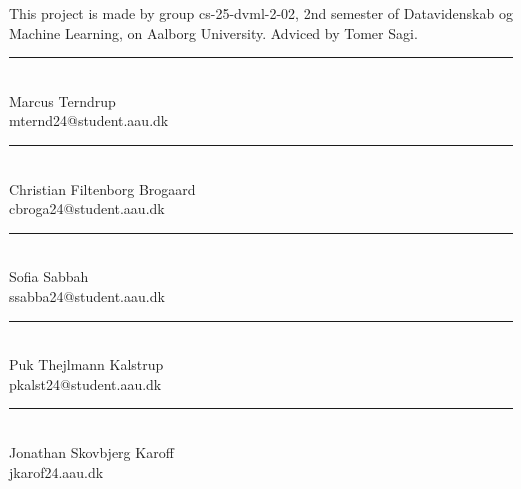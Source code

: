 
This project is made by group cs-25-dvml-2-02, 2nd semester of Datavidenskab og Machine Learning, on Aalborg University. Adviced by Tomer Sagi.

\vspace{40 mm} 
\begin{minipage}[b]{0.45\textwidth}
	\centering
	\rule{\textwidth}{0.5pt}\\
	Marcus Terndrup \\
	{\footnotesize mternd24@student.aau.dk
	}
\end{minipage}
\hfill
\vspace{40 mm}
\begin{minipage}[b]{0.45\textwidth}
	\centering
	\rule{\textwidth}{0.5pt}\\
	Christian Filtenborg Brogaard\\
	{\footnotesize cbroga24@student.aau.dk
	}
\end{minipage}
\hfill
\begin{minipage}[b]{0.45\textwidth}
	\centering
	\rule{\textwidth}{0.5pt}\\
	Sofia Sabbah \\
	{\footnotesize ssabba24@student.aau.dk
	}
\end{minipage}
\hfill
\begin{minipage}[b]{0.45\textwidth}
	\centering
	\rule{\textwidth}{0.5pt}\\
	Puk Thejlmann Kalstrup\\
	{\footnotesize pkalst24@student.aau.dk}
\end{minipage}
\hfill
\vspace{40 mm}
\begin{minipage}[b]{0.45\textwidth}
	\centering
	\rule{\textwidth}{0.5pt}\\
	Jonathan Skovbjerg Karoff\\
	{\footnotesize jkarof24.aau.dk
	}
\end{minipage}